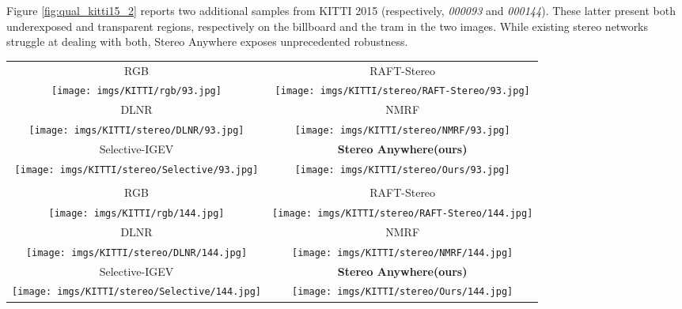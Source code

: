 \documentclass[10pt,twocolumn,letterpaper]{article}
\newcommand{\method}[0]{Stereo Anywhere\xspace}
\begin{document}
\clearpage

Figure \ref{fig:qual_kitti15_2} reports two additional samples from KITTI 2015 (respectively, \textit{000093} and \textit{000144}). These latter present both underexposed and transparent regions, respectively on the billboard and the tram in the two images. While existing stereo networks struggle at dealing with both, \method exposes unprecedented robustness.

\begin{figure*}[h]
    \centering
    \renewcommand{\tabcolsep}{1pt}
    \begin{tabular}{cc}
        \small RGB &
        \small RAFT-Stereo \cite{lipson2021raft} \\
        \texttt{[image: imgs/KITTI/rgb/93.jpg]} &
        \texttt{[image: imgs/KITTI/stereo/RAFT-Stereo/93.jpg]} \\
        \small DLNR \cite{zhao2023high} &
        \small NMRF \cite{guan2024neural} \\
        \texttt{[image: imgs/KITTI/stereo/DLNR/93.jpg]} &
        \texttt{[image: imgs/KITTI/stereo/NMRF/93.jpg]} \\
        \small Selective-IGEV \cite{wang2024selective} &
        \textbf{\method (ours)} \\
        \texttt{[image: imgs/KITTI/stereo/Selective/93.jpg]} &
        \texttt{[image: imgs/KITTI/stereo/Ours/93.jpg]} \\ \\
        \small RGB &
        \small RAFT-Stereo \cite{lipson2021raft} \\
        \texttt{[image: imgs/KITTI/rgb/144.jpg]} &
        \texttt{[image: imgs/KITTI/stereo/RAFT-Stereo/144.jpg]} \\
        \small DLNR \cite{zhao2023high} &
        \small NMRF \cite{guan2024neural} \\
        \texttt{[image: imgs/KITTI/stereo/DLNR/144.jpg]} &
        \texttt{[image: imgs/KITTI/stereo/NMRF/144.jpg]} \\
        \small Selective-IGEV \cite{wang2024selective} &
        \textbf{\method (ours)} \\
        \texttt{[image: imgs/KITTI/stereo/Selective/144.jpg]} &
        \texttt{[image: imgs/KITTI/stereo/Ours/144.jpg]} \\
    \end{tabular}

    \caption{\textbf{Qualitative Results -- KITTI 2015 (part 2).} Predictions by state-of-the-art models and \method.}
    \label{fig:qual_kitti15_2}\vspace{-0.3cm}

\end{figure*}
\end{document}
